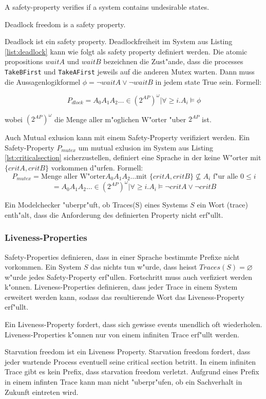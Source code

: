 \documentclass[a4paper, twoside]{article}
\begin{document}
A safety-property verifies if a system contains undesirable states.

Deadlock freedom is a safety property.

Deadlock ist ein safety property. Deadlockfreiheit im System aus Listing \ref{list:deadlock} kann wie folgt als safety property definiert werden. Die atomic propositions $waitA$ und $waitB$ bezeichnen die Zust"ande, dass die processes \verb|TakeBFirst| und \verb|TakeAFirst| jeweils auf die anderen Mutex warten. Dann muss die Aussagenlogikformel  $\phi=\neg waitA \lor \neg waitB$ in jedem state True sein. Formell:

\[
P_{dlock} = {A_0 A_1 A_2 \dots \in (2^{AP})^{\omega} | \forall \geq i.   A_i \models \phi}
\]

wobei $(2^{AP})^{\omega}$ die Menge aller m"oglichen W"orter "uber $2^{AP}$ ist.

Auch Mutual exlusion kann mit einem Safety-Property verifiziert werden. Ein Safety-Property $P_{mutex}$ um mutual exlusion im System aus Listing \ref{lst:criticalsection} sicherzustellen, definiert eine Sprache in der keine W"orter mit $\{critA,critB\}$ vorkommen d"urfen. Formell:
\[
P_{mutex} = \text{Menge aller W"orter} A_0 A_1 A_2 \dots \text{mit } \{critA,critB\} \not \subseteq A_i \text{ f"ur alle } 0 \leq i
\]
\[
 = {A_0 A_1 A_2 \dots \in (2^{AP})^{\omega} | \forall \geq i.   A_i \models \neg critA \lor \neg critB}
\]

Ein Modelchecker "uberpr"uft, ob Traces(S) eines Systems $S$ ein Wort (trace) enth"alt, dass die Anforderung des definierten Property nicht erf"ullt.

\subsubsection{Liveness-Properties}
\label{sec:liveness}

Safety-Properties definieren, dass in einer Sprache bestimmte Prefixe nicht vorkommen. Ein System $S$ das nichts tun w"urde, dass heisst $Traces(S)=\varnothing$ w"urde jedes Safety-Property erf"ullen. Fortschritt muss auch verfiziert werden k"onnen. Liveness-Properties definieren, dass jeder Trace in einem System erweitert werden kann, sodass das resultierende Wort das Liveness-Property erf"ullt.

Ein Liveness-Property fordert, dass sich gewisse events unendlich oft wiederholen. Liveness-Properties k"onnen nur von einem infiniten Trace erf"ullt werden. 

Starvation freedom ist ein Liveness Property. Starvation freedom fordert, dass jeder wartende Process eventuell seine critical section betritt. In einem infiniten Trace gibt es kein Prefix, dass starvation freedom verletzt. Aufgrund eines Prefix in einem infinten Trace kann man nicht "uberpr"ufen, ob ein Sachverhalt in Zukunft eintreten wird.
\end{document}
